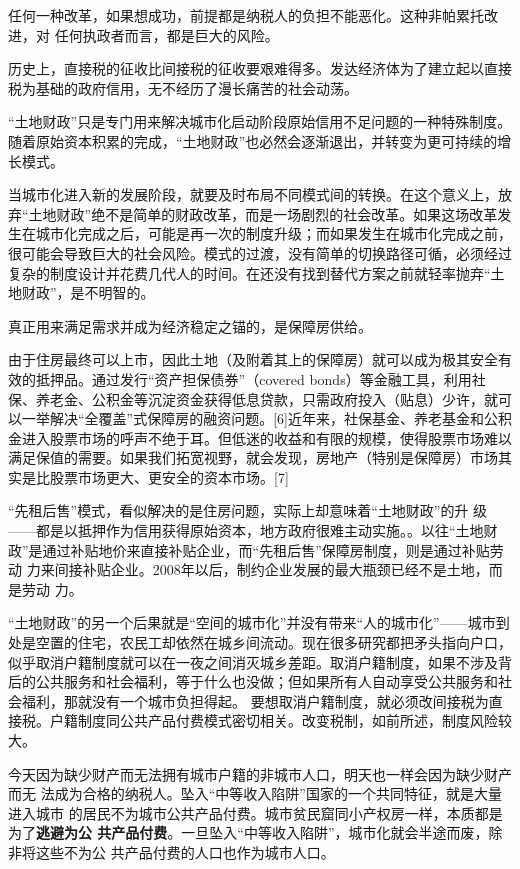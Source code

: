 任何一种改革，如果想成功，前提都是纳税人的负担不能恶化。这种非帕累托改进，对
任何执政者而言，都是巨大的风险。

历史上，直接税的征收比间接税的征收要艰难得多。发达经济体为了建立起以直接税为基础的政府信用，无不经历了漫长痛苦的社会动荡。

“土地财政”只是专门用来解决城市化启动阶段原始信用不足问题的一种特殊制度。随着原始资本积累的完成，“土地财政”也必然会逐渐退出，并转变为更可持续的增长模式。

当城市化进入新的发展阶段，就要及时布局不同模式间的转换。在这个意义上，放弃“土地财政”绝不是简单的财政改革，而是一场剧烈的社会改革。如果这场改革发生在城市化完成之后，可能是再一次的制度升级；而如果发生在城市化完成之前，很可能会导致巨大的社会风险。模式的过渡，没有简单的切换路径可循，必须经过复杂的制度设计并花费几代人的时间。在还没有找到替代方案之前就轻率抛弃“土地财政”，是不明智的。

真正用来满足需求并成为经济稳定之锚的，是保障房供给。

由于住房最终可以上市，因此土地（及附着其上的保障房）就可以成为极其安全有效的抵押品。通过发行“资产担保债券”（covered bonds）等金融工具，利用社保、养老金、公积金等沉淀资金获得低息贷款，只需政府投入（贴息）少许，就可以一举解决“全覆盖”式保障房的融资问题。[6]近年来，社保基金、养老基金和公积金进入股票市场的呼声不绝于耳。但低迷的收益和有限的规模，使得股票市场难以满足保值的需要。如果我们拓宽视野，就会发现，房地产（特别是保障房）市场其实是比股票市场更大、更安全的资本市场。[7]

“先租后售”模式，看似解决的是住房问题，实际上却意味着“土地财政”的升
级——都是以抵押作为信用获得原始资本，地方政府很难主动实施。。以往“土地财
政”是通过补贴地价来直接补贴企业，而“先租后售”保障房制度，则是通过补贴劳动
力来间接补贴企业。2008年以后，制约企业发展的最大瓶颈已经不是土地，而是劳动
力。

“土地财政”的另一个后果就是“空间的城市化”并没有带来“人的城市化”——城市到处是空置的住宅，农民工却依然在城乡间流动。现在很多研究都把矛头指向户口，似乎取消户籍制度就可以在一夜之间消灭城乡差距。取消户籍制度，如果不涉及背后的公共服务和社会福利，等于什么也没做；但如果所有人自动享受公共服务和社会福利，那就没有一个城市负担得起。
要想取消户籍制度，就必须改间接税为直接税。户籍制度同公共产品付费模式密切相关。改变税制，如前所述，制度风险较大。

今天因为缺少财产而无法拥有城市户籍的非城市人口，明天也一样会因为缺少财产而无
法成为合格的纳税人。坠入“中等收入陷阱”国家的一个共同特征，就是大量进入城市
的居民不为城市公共产品付费。城市贫民窟同小产权房一样，本质都是为了\textbf{逃避为公
  共产品付费}。一旦坠入“中等收入陷阱”，城市化就会半途而废，除非将这些不为公
共产品付费的人口也作为城市人口。

